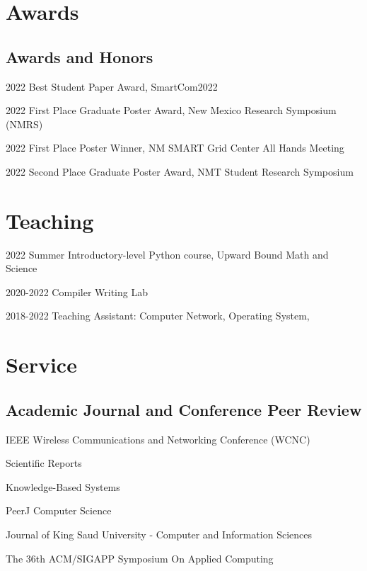 \documentclass[12pt,letterpaper]{report}
\newcommand{\listitemspace}{0.25em}
\renewenvironment{itemize}
{\begin{list}{}{\setlength{\leftmargin}{0em}
                \setlength{\parskip}{0em}
                \setlength{\itemsep}{\listitemspace}
                \setlength{\parsep}{\listitemspace}}}
{\end{list}}
\begin{document}
    \section*{Awards}
    \subsection*{Awards and Honors}
    \begin{tablist}
        \item[2022] \tab{}Best Student Paper Award, SmartCom2022
        \item[2022] \tab{}First Place Graduate Poster Award, New Mexico Research Symposium (NMRS)
        \item[2022] \tab{}First Place Poster Winner, NM SMART Grid Center All Hands Meeting
        \item[2022] \tab{}Second Place Graduate Poster Award, NMT Student Research Symposium
    \end{tablist}

    \section*{Teaching}
    \begin{tablist}
        \item[2022 Summer] \tab{}Introductory-level Python course, Upward Bound Math and Science
        \item[2020-2022] \tab{}Compiler Writing Lab
        \item[2018-2022] \tab{}Teaching Assistant: Computer Network, Operating System, 
    \end{tablist}

    \section*{Service}
    \subsection*{Academic Journal and Conference Peer Review}
    \begin{itemize}
        \item IEEE Wireless Communications and Networking Conference (WCNC)
        \item Scientific Reports
        \item Knowledge-Based Systems
        \item PeerJ Computer Science
        \item Journal of King Saud University - Computer and Information Sciences 
        \item The 36th ACM/SIGAPP Symposium On Applied Computing
    \end{itemize}
\end{document}

